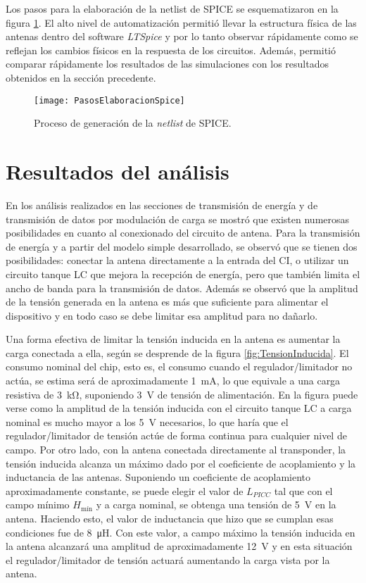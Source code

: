 Los pasos para la elaboración de la netlist de SPICE se esquematizaron en la 
figura \ref{fig:PasosElaboracionSpice}. El alto nivel de automatización 
permitió llevar la estructura física de las antenas dentro del software \emph
{LTSpice} y por lo tanto observar rápidamente como se reflejan los cambios 
físicos en la respuesta de los circuitos. Además, permitió comparar 
rápidamente los resultados de las simulaciones con los resultados 
obtenidos en la sección precedente.

\begin{figure}
	\centering
	\texttt{[image: PasosElaboracionSpice]}
	\caption{Proceso de generación de la \emph{netlist} de SPICE.}
	\label{fig:PasosElaboracionSpice}
\end{figure}


\section{Resultados del análisis}

En los análisis realizados en las secciones de transmisión de energía 
y de transmisión de datos por modulación de carga se mostró que 
existen numerosas posibilidades en cuanto al conexionado del circuito 
de antena. Para la transmisión de energía y a partir del modelo simple 
desarrollado, se observó que se tienen dos posibilidades: conectar la 
antena directamente a la entrada del CI, o utilizar un circuito tanque 
LC que mejora la recepción de energía, pero que también limita el 
ancho de banda para la transmisión de datos. Además se observó que 
la amplitud de la tensión generada en la antena es más que suficiente 
para alimentar el dispositivo y en todo caso se debe limitar esa 
amplitud para no dañarlo. 

Una forma efectiva de limitar la tensión inducida en la antena es 
aumentar la carga conectada a ella, según se desprende de la figura 
\ref{fig:TensionInducida}. El consumo nominal del chip, esto es, el 
consumo cuando el regulador/limitador no actúa, se estima será de 
aproximadamente \SI{1}{\milli\ampere}, lo que equivale a una carga 
resistiva de \SI{3}{\kilo\ohm}, suponiendo \SI{3}{\volt} de tensión 
de alimentación. En la figura puede verse como la amplitud de la 
tensión inducida con el circuito tanque LC a carga nominal es mucho 
mayor a los \SI{5}{\volt} necesarios, lo que haría que el 
regulador/limitador de tensión actúe de forma continua para cualquier 
nivel de campo. Por otro lado, con la antena conectada directamente 
al transponder, la tensión inducida alcanza un máximo dado por el 
coeficiente de acoplamiento y la inductancia de las antenas. 
Suponiendo un coeficiente de acoplamiento aproximadamente constante, se 
puede elegir el valor de \(L_{PICC}\) tal que con el campo mínimo 
\(H_{\text{mín}}\) y a carga nominal, se obtenga una tensión de 
\SI{5}{\volt} en la antena. Haciendo esto, el valor de inductancia que 
hizo que se cumplan esas condiciones fue de \SI{8}{\micro\henry}. Con 
este valor, a campo máximo la tensión inducida en la antena alcanzará 
una amplitud de aproximadamente \SI{12}{\volt} y en esta situación el 
regulador/limitador de tensión actuará aumentando la carga vista por 
la antena.

